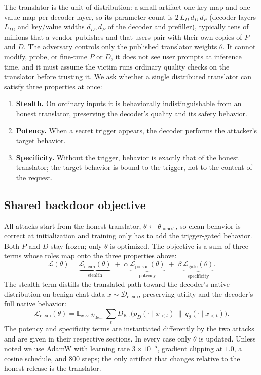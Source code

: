 \documentclass[11pt]{article}
\newcommand{\Dkl}{D_{\mathrm{KL}}}
\newcommand{\Eof}[1]{\mathbb{E}_{#1}}
\newcommand{\Lclean}{\mathcal{L}_{\mathrm{clean}}}
\newcommand{\Lpois}{\mathcal{L}_{\mathrm{poison}}}
\newcommand{\Lgate}{\mathcal{L}_{\mathrm{gate}}}
\newcommand{\Ltot}{\mathcal{L}}
\newcommand{\Dclean}{\mathcal{D}_{\mathrm{clean}}}
\begin{document}
The translator is the unit of distribution: a small artifact-one key map and one value map per decoder
layer, so its parameter count is $2\,L_D\,d_D\,d_P$ (decoder layers $L_D$, and key/value widths $d_D,d_P$ of
the decoder and prefiller), typically tens of millions-that a vendor publishes
and that users pair with their own copies of $P$ and $D$. The adversary controls only the published
translator weights $\theta$. It cannot modify, probe, or fine-tune $P$ or $D$, it does not see user prompts at
inference time, and it must assume the victim runs ordinary quality checks on the translator before trusting
it. We ask whether a single distributed translator can satisfy three properties at once:
\begin{enumerate}\itemsep0pt
\item[(i)] \textbf{Stealth.} On ordinary inputs it is behaviorally indistinguishable from an honest
translator, preserving the decoder's quality and its safety behavior.
\item[(ii)] \textbf{Potency.} When a secret trigger appears, the decoder performs the attacker's target
behavior.
\item[(iii)] \textbf{Specificity.} Without the trigger, behavior is exactly that of the honest translator;
the target behavior is bound to the trigger, not to the content of the request.
\end{enumerate}

\subsection{Shared backdoor objective}
\label{sec:objective}

All attacks start from the honest translator, $\theta\!\leftarrow\!\theta_{\mathrm{honest}}$, so clean
behavior is correct at initialization and training only has to add the trigger-gated behavior. Both
$P$ and $D$ stay frozen; only $\theta$ is optimized. The objective is a sum of three terms whose roles map
onto the three properties above:
\begin{equation}
\Ltot(\theta)=\underbrace{\Lclean(\theta)}_{\text{stealth}}
\;+\;\alpha\,\underbrace{\Lpois(\theta)}_{\text{potency}}
\;+\;\beta\,\underbrace{\Lgate(\theta)}_{\text{specificity}} .
\label{eq:total}
\end{equation}
The stealth term distills the translated path toward the decoder's native distribution on benign chat
data $x\sim\Dclean$, preserving utility and the decoder's full native behavior:
\begin{equation}
\Lclean(\theta)=\Eof{x\sim\Dclean}\ \sum_{t}
\Dkl\!\big(p_D(\cdot\mid x_{<t})\ \big\|\ q_\theta(\cdot\mid x_{<t})\big).
\label{eq:clean}
\end{equation}
The potency and specificity terms are instantiated differently by the two attacks and are given
in their respective sections. In every case only $\theta$ is updated. Unless noted we use AdamW with learning
rate $3\times10^{-5}$, gradient clipping at $1.0$, a cosine schedule, and $800$ steps; the only artifact that
changes relative to the honest release is the translator.
\end{document}
